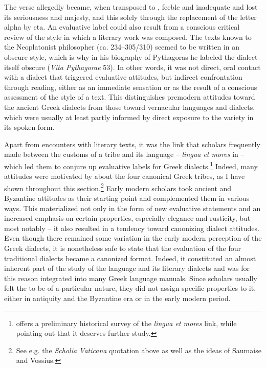 The  verse allegedly became, when transposed to , feeble and inadequate and lost its seriousness and majesty, and this solely through the replacement of the letter alpha by eta. An evaluative label could also result from a conscious critical review of the style in which a literary work was composed. The  texts known to the Neoplatonist philosopher  (ca. 234–305/310) seemed to be written in an obscure style, which is why in his biography of Pythagoras he labeled the dialect itself obscure (\textit{Vita Pythagorae} 53). In other words, it was not direct, oral contact with a dialect that triggered evaluative attitudes, but indirect confrontation through reading, either as an immediate sensation or as the result of a conscious assessment of the style of a text. This distinguishes premodern attitudes toward the ancient Greek dialects from those toward vernacular languages and dialects, which were usually at least partly informed by direct exposure to the variety in its spoken form.

Apart from encounters with literary texts, it was the link that scholars frequently made between the customs of a tribe and its language – \textit{lingua et mores} in  – which led them to conjure up evaluative labels for Greek dialects.\footnote{\citet{VanHal2013} offers a preliminary historical survey of the \textit{lingua et mores} link, while pointing out that it deserves further study.} Indeed, many attitudes were motivated by  about the four canonical Greek tribes, as I have shown throughout this section.\footnote{See e.g. the \textit{Scholia Vaticana} quotation above as well as the ideas of Saumaise and Vossius.} Early modern scholars took ancient and Byzantine attitudes as their starting point and complemented them in various ways. This materialized not only in the form of new evaluative statements and an increased emphasis on certain properties, especially  elegance and  rusticity, but – most notably – it also resulted in a tendency toward canonizing dialect attitudes. Even though there remained some variation in the early modern perception of the Greek dialects, it is nonetheless safe to state that the evaluation of the four traditional dialects became a canonized format. Indeed, it constituted an almost inherent part of the study of the  language and its literary dialects and was for this reason integrated into many Greek language manuals. Since scholars usually felt the  to be of a particular nature, they did not assign specific properties to it, either in antiquity and the Byzantine era or in the early modern period.

